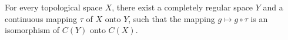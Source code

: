 For every topological space $X$, there exist a completely regular space $Y$ and a continuous mapping $\tau$ of $X$ onto $Y$, such that the mapping $g \mapsto g \circ \tau$ is an isomorphism of $C(Y)$ onto $C(X)$.
